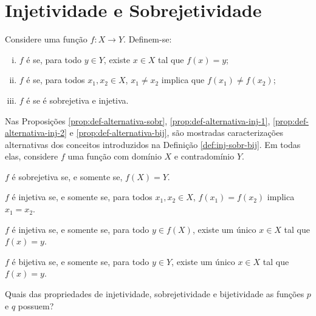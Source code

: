 \section{Injetividade e Sobrejetividade}

\begin{definition}
\label{def:inj-sobr-bij}
    Considere uma função $f: X \to Y$. Definem-se:
    \begin{enumerate}[(i)]
    \item $f$ é  se, para todo $y \in Y$, existe $x
    \in X$ tal que $f(x) = y$;
    \item $f$ é  se, para todos $x_1, x_2 \in X$, $x_1 \ne x_2$ implica que $f(x_1) \ne f(x_2)$;
    \item $f$ é  se é sobrejetiva e injetiva.
    \end{enumerate}
\end{definition}

Nas Proposições \ref{prop:def-alternativa-sobr}, \ref{prop:def-alternativa-inj-1}, \ref{prop:def-alternativa-inj-2} e \ref{prop:def-alternativa-bij}, são mostradas caracterizações alternativas dos conceitos introduzidos na Definição \ref{def:inj-sobr-bij}.
Em todas elas, considere $f$ uma função com domínio $X$ e contradomínio $Y$.
%
\begin{proposition}
\label{prop:def-alternativa-sobr}
    $f$ é sobrejetiva se, e somente se, $f(X) = Y$.
\end{proposition}

\begin{proposition}
\label{prop:def-alternativa-inj-1}
    $f$ é injetiva se, e somente se, para todos $x_1, x_2 \in X$, $f(x_1) = f(x_2)$ implica $x_1 = x_2$.
\end{proposition}

\begin{proposition}
\label{prop:def-alternativa-inj-2}
    $f$ é injetiva se, e somente se, para todo $y \in f(X)$, existe um único $x \in X$ tal que $f(x) = y$.
\end{proposition}

\begin{proposition}
\label{prop:def-alternativa-bij}
    $f$ é bijetiva se, e somente se, para todo $y \in Y$, existe um único $x \in X$ tal que $f(x) = y$.
\end{proposition}

\begin{example}
    Quais das propriedades de injetividade, sobrejetividade e bijetividade as funções $p$ e $q$ possuem?
\end{example}

